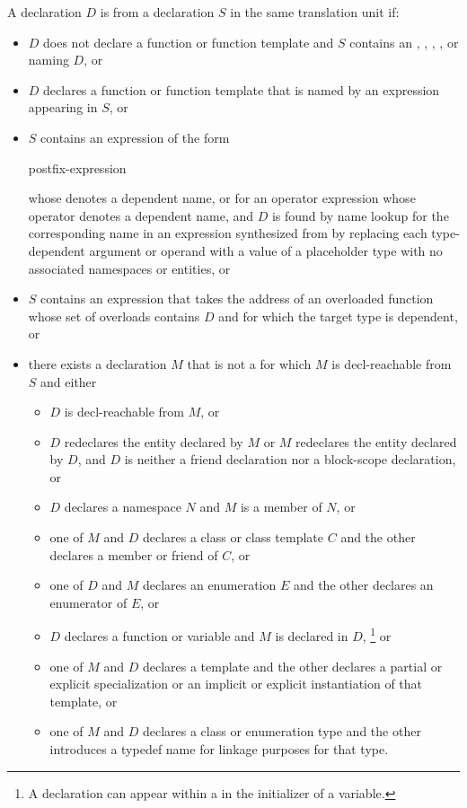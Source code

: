 \pnum
A declaration $D$ is  from a declaration $S$
in the same translation unit if:
\begin{itemize}
\item
$D$ does not declare a function or function template and
$S$ contains an
,
,
,
, or
naming $D$, or

\item
$D$ declares a function or function template that
is named by an expression
appearing in $S$, or

\item
$S$ contains an expression  of the form

\begin{ncsimplebnf}
postfix-expression \terminal{(}  \terminal{)}
\end{ncsimplebnf}
whose  denotes a dependent name,
or for an operator expression whose operator denotes a dependent name,
and $D$ is found by name lookup for the corresponding name
in an expression synthesized from 
by replacing each type-dependent argument or operand
with a value of a placeholder type
with no associated namespaces or entities, or

\item
$S$ contains an expression that
takes the address of an overloaded function
whose set of overloads contains $D$ and
for which the target type is dependent, or

\item
there exists a declaration $M$ that is not a 
for which $M$ is decl-reachable from $S$ and either
\begin{itemize}
\item
$D$ is decl-reachable from $M$, or
\item
$D$ redeclares the entity declared by $M$ or
$M$ redeclares the entity declared by $D$,
and $D$ is neither a friend declaration
nor a block-scope declaration, or
\item
$D$ declares a namespace $N$ and $M$ is a member of $N$, or
\item
one of $M$ and $D$ declares a class or class template $C$
and the other declares a member or friend of $C$, or
\item
one of $D$ and $M$ declares an enumeration $E$
and the other declares an enumerator of $E$, or
\item
$D$ declares a function or variable and $M$ is declared in $D$,%
\footnote{A declaration can appear within a 
in the initializer of a variable.} or
\item
one of $M$ and $D$ declares a template and the other declares
a partial or explicit specialization or
an implicit or explicit instantiation of that template, or
\item
one of $M$ and $D$ declares a class or enumeration type
and the other introduces a typedef name for linkage purposes for that type.
\end{itemize}
\end{itemize}
